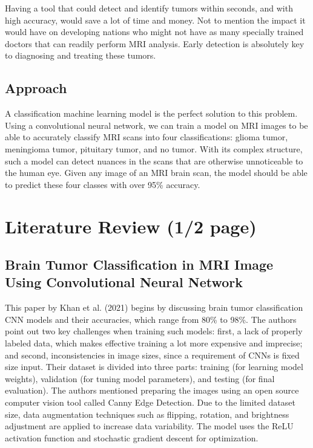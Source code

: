 \documentclass[conference]{IEEEtran}
\begin{document}
Having a tool that could detect and identify tumors within seconds, and with high accuracy, would save a lot of time and money. Not to mention the impact it would have on developing nations who might not have as many specially trained doctors that can readily perform MRI analysis. Early detection is absolutely key to diagnosing and treating these tumors.

\subsection{Approach}

A classification machine learning model is the perfect solution to this problem. Using a convolutional neural network, we can train a model on MRI images to be able to accurately classify MRI scans into four classifications: glioma tumor, meningioma tumor, pituitary tumor, and no tumor. With its complex structure, such a model can detect nuances in the scans that are otherwise unnoticeable to the human eye. Given any image of an MRI brain scan, the model should be able to predict these four classes with over 95\% accuracy.

\section{Literature Review (1/2 page)}

\subsection{Brain Tumor Classification in MRI Image Using Convolutional Neural Network}

This paper by Khan et al. (2021) begins by discussing brain tumor classification CNN models and their accuracies, which range from 80\% to 98\%. The authors point out two key challenges when training such models: first, a lack of properly labeled data, which makes effective training a lot more expensive and imprecise; and second, inconsistencies in image sizes, since a requirement of CNNs is fixed size input. Their dataset is divided into three parts: training (for learning model weights), validation (for tuning model parameters), and testing (for final evaluation). The authors mentioned preparing the images using an open source computer vision tool called Canny Edge Detection. Due to the limited dataset size, data augmentation techniques such as flipping, rotation, and brightness adjustment are applied to increase data variability. The model uses the ReLU activation function and stochastic gradient descent for optimization.
\end{document}
